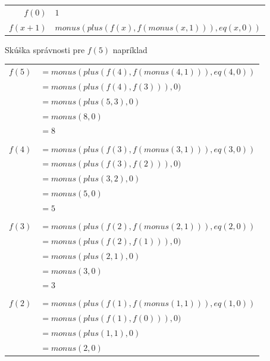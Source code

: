 \documentclass[11pt,a4paper]{article}
\begin{document}
\begin{center}
\begin{tabular}{r@{ $=$ }l}
  $f(0)$   & $1$ \\
  $f(x+1)$ & $monus(plus(f(x),f(monus(x,1))),eq(x,0))$ \\
\end{tabular}
\end{center}

Skúška správnosti pre $f(5)$ napríklad\\

\begin{tabular}{rl}
$f(5)$\hspace{-3mm} & $= monus(plus(f(4),f(monus(4,1))),eq(4,0))$\\
                    & $= monus(plus(f(4),f(3))),0)$\\
                    & $= monus(plus(5,3),0)$\\
                    & $= monus(8,0)$\\
                    & $= 8$\\
\\[-0.5em]
$f(4)$\hspace{-3mm} & $= monus(plus(f(3),f(monus(3,1))),eq(3,0))$\\
                    & $= monus(plus(f(3),f(2))),0)$\\
                    & $= monus(plus(3,2),0)$\\
                    & $= monus(5,0)$\\
                    & $= 5$\\
\\[-0.5em]
$f(3)$\hspace{-3mm} & $= monus(plus(f(2),f(monus(2,1))),eq(2,0))$\\
                    & $= monus(plus(f(2),f(1))),0)$\\
                    & $= monus(plus(2,1),0)$\\
                    & $= monus(3,0)$\\
                    & $= 3$\\
\\[-0.5em]
$f(2)$\hspace{-3mm} & $= monus(plus(f(1),f(monus(1,1))),eq(1,0))$\\
                    & $= monus(plus(f(1),f(0))),0)$\\
                    & $= monus(plus(1,1),0)$\\
                    & $= monus(2,0)$\\

\end{tabular}
\end{document}
